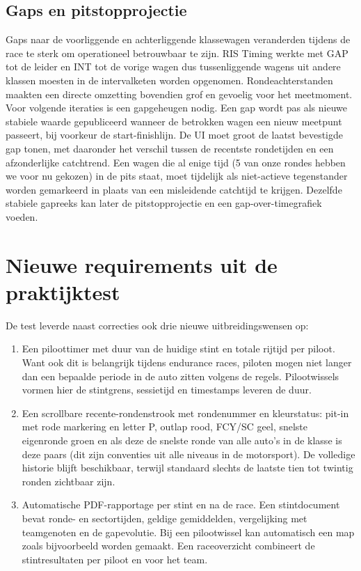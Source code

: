 \subsection{Gaps en pitstopprojectie}
Gaps naar de voorliggende en achterliggende klassewagen veranderden tijdens de race te sterk om
operationeel betrouwbaar te zijn. RIS Timing werkte met GAP tot de leider en INT tot de vorige
wagen dus tussenliggende wagens uit andere klassen moesten in de intervalketen worden opgenomen.
Rondeachterstanden maakten een directe omzetting bovendien grof en gevoelig voor het meetmoment.
Voor volgende iteraties is een gapgeheugen nodig. Een gap wordt pas als nieuwe stabiele waarde
gepubliceerd wanneer de betrokken wagen een nieuw meetpunt passeert, bij voorkeur de
start-finishlijn. De UI moet groot de laatst bevestigde gap tonen, met daaronder het verschil tussen
de recentste rondetijden en een afzonderlijke catchtrend. Een wagen die al enige tijd (5 van onze rondes hebben we voor nu gekozen) in de pits staat, moet tijdelijk als niet-actieve tegenstander worden gemarkeerd in
plaats van een misleidende catchtijd te krijgen. Dezelfde stabiele gapreeks kan later de
pitstopprojectie en een gap-over-timegrafiek voeden.


\section{Nieuwe requirements uit de praktijktest}
De test leverde naast correcties ook drie nieuwe uitbreidingswensen op:

\begin{enumerate}
  \item Een piloottimer met duur van de huidige stint en totale rijtijd per piloot. Want ook dit is belangrijk tijdens endurance races, piloten mogen niet langer dan een bepaalde periode in de auto zitten volgens de regels. Pilootwissels
        vormen hier de stintgrens, sessietijd en timestamps leveren de duur.
  \item Een scrollbare recente-rondenstrook met rondenummer en kleurstatus: pit-in met rode
        markering en letter P, outlap rood, FCY/SC geel, snelste eigenronde groen en als deze de snelste ronde van alle auto's in de klasse is deze paars (dit zijn conventies uit alle niveaus in de motorsport). De volledige historie blijft beschikbaar,
        terwijl standaard slechts de laatste tien tot twintig ronden zichtbaar zijn.
  \item Automatische PDF-rapportage per stint en na de race. Een stintdocument bevat ronde- en
        sectortijden, geldige gemiddelden, vergelijking met teamgenoten en de gapevolutie. Bij een
        pilootwissel kan automatisch een map zoals bijvoorbeeld  worden gemaakt. Een
        raceoverzicht combineert de stintresultaten per piloot en voor het team.
\end{enumerate}

